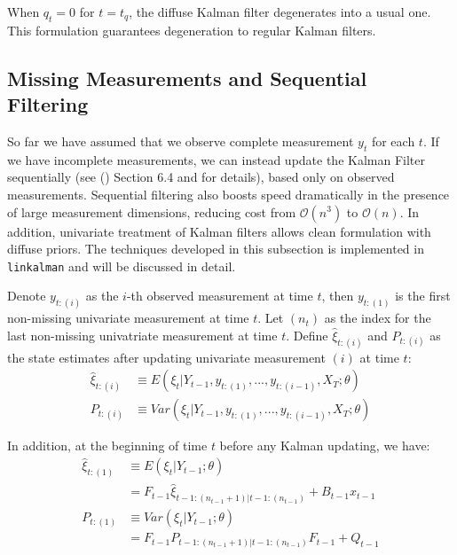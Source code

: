 \documentclass[10pt, titlepage]{article}
\numberwithin{equation}{section}
\begin{document}
When $q_{t}=0$ for $t=t_q$, the diffuse Kalman filter degenerates into a usual one. This formulation guarantees degeneration to regular Kalman filters.

\subsection{Missing Measurements and Sequential Filtering} \label{subsec:seq_filter}
So far we have assumed that we observe complete measurement $y_t$ for each $t$. If we have incomplete measurements, we can instead update the Kalman Filter sequentially (see (\cite{durbin_koopman_2001}) Section 6.4 and \cite{durbin_koopman_2000} for details), based only on observed measurements. Sequential filtering also boosts speed dramatically in the presence of large measurement dimensions, reducing cost from $\mathcal{O}(n^3)$ to $\mathcal{O}(n)$. In addition, univariate treatment of Kalman filters allows clean formulation with diffuse priors. The techniques developed in this subsection is implemented in \texttt{linkalman} and will be discussed in detail. 

Denote $y_{t:(i)}$ as the $i$-th observed measurement at time $t$, then $y_{t:(1)}$ is the first non-missing univariate measurement at time $t$. Let $(n_t)$ as the index for the last non-missing univatriate measurement at time $t$. Define $\hat{\xi}_{t:(i)}$ and $P_{t:(i)}$ as the state estimates after updating univariate measurement $(i)$ at time $t$:
\begin{align*}
    \hat{\xi}_{t:(i)} &\equiv E(\xi_t|Y_{t-1},y_{t:(1)},...,y_{t:(i-1)},X_T;\theta) \\
    P_{t:(i)} &\equiv Var(\xi_t|Y_{t-1},y_{t:(1)},...,y_{t:(i-1)},X_T;\theta) 
\end{align*}

In addition, at the beginning of time $t$ before any Kalman updating, we have:
\begin{align}
    \hat{\xi}_{t:(1)} &\equiv E(\xi_{t}|Y_{t-1};\theta)\nonumber \\
    &= F_{t-1}\hat{\xi}_{t-1:(n_{t-1}+1)|t-1:(n_{t-1})}+B_{t-1}x_{t-1} \label{eq:diff_xi_seq0} \\
    P_{t:(1)} &\equiv Var(\xi_{t}|Y_{t-1};\theta) \nonumber \\
    &= F_{t-1}P_{t-1:(n_{t-1}+1)|t-1:(n_{t-1})}F_{t-1} + Q_{t-1} \label{eq:diff_P_seq0}
\end{align}
\end{document}
